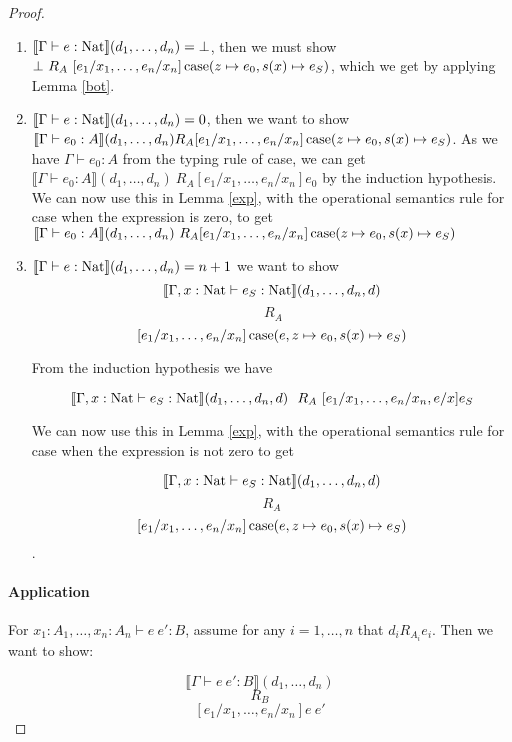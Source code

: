 \begin{proof}
\begin{enumerate}
\item{$\llbracket \Gamma \vdash e : \operatorname{Nat} \rrbracket (d_1, \dots, d_n) = \bot$, then we must show $\bot \ R_A \ [e_1/x_1, \dots, e_n/x_n] \\ \operatorname{case} (z \mapsto e_0, s(x) \mapsto e_S)$, which we get by applying Lemma \ref{bot}.}
\item{$\llbracket \Gamma \vdash e : \operatorname{Nat} \rrbracket (d_1, \dots, d_n) = 0$, then we want to show $\llbracket \Gamma \vdash e_0 : A \rrbracket (d_1, \dots, d_n) \ \\ R_A [e_1/x_1, \dots, e_n/x_n]\operatorname{case} (z \mapsto e_0, s(x) \mapsto e_S)$. As we have $\Gamma \vdash e_0 : A$ from the typing rule of case, we can get $\llbracket \Gamma \vdash e_0 : A \rrbracket (d_1, \dots, d_n) \ R_A [e_1/x_1, \dots, e_n/x_n]e_0$ by the induction hypothesis. We can now use this in Lemma \ref{exp}, with the operational semantics rule for case when the expression is zero, to get $\llbracket \Gamma \vdash e_0 : A \rrbracket (d_1, \dots, d_n) \ R_A [e_1/x_1, \dots, e_n/x_n]\operatorname{case} (z \mapsto e_0, s(x) \mapsto e_S)$}
\item{$\llbracket \Gamma \vdash e : \operatorname{Nat} \rrbracket (d_1, \dots, d_n) = n+1$ we want to show
\[ \llbracket \Gamma, x : \operatorname{Nat} \vdash e_S : \operatorname{Nat} \rrbracket(d_1, \dots , d_n, d) \]
\[\ R_A \]
\[ [e_1/x_1, \dots, e_n/x_n]\operatorname{case} (e, z \mapsto e_0, s(x) \mapsto e_S)\]

From the induction hypothesis we have 

\[ \llbracket \Gamma, x : \operatorname{Nat} \vdash e_S : \operatorname{Nat} \rrbracket(d_1, \dots, d_n, d) \ \ R_A \ [e_1/x_1, \dots, e_n/x_n, e/x]e_S\]

We can now use this in Lemma \ref{exp}, with the operational semantics rule for case when the expression is not zero to get 

\[ \llbracket \Gamma, x : \operatorname{Nat} \vdash e_S : \operatorname{Nat} \rrbracket(d_1, \dots , d_n, d) \]
\[ R_A \]
\[ [e_1/x_1, \dots, e_n/x_n]\operatorname{case} (e, z \mapsto e_0, s(x) \mapsto e_S)\].


}
\end{enumerate}

\paragraph{Application} For $x_1 : A_1, \dots, x_n : A_n \vdash e \ e' : B$, assume for any $i = 1, \dots, n$ that $d_i R_{A_i} e_i$. Then we want to show:

\[ \llbracket \Gamma \vdash  e \ e' : B \rrbracket (d_1, \dots, d_n) \]
\[ R_B \]
\[ [e_1/x_1, \dots, e_n/x_n]e \ e' \]


\end{proof}
